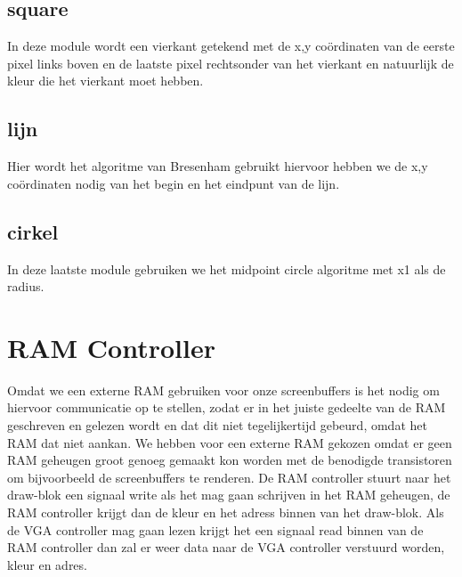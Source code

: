 \documentclass{scrreprt} %
\begin{document}
\subsection { square}
In deze module wordt een vierkant getekend met de x,y coördinaten van de eerste pixel links boven en de laatste pixel rechtsonder van het vierkant en natuurlijk de kleur die het vierkant moet hebben.

\subsection { lijn}
Hier wordt het algoritme van Bresenham gebruikt hiervoor hebben we de x,y coördinaten nodig van het begin en het eindpunt van de lijn.

\subsection { cirkel}
In deze laatste module gebruiken we het midpoint circle algoritme met x1 als de radius.

\section{RAM Controller}
Omdat we een externe RAM gebruiken voor onze screenbuffers is het nodig om hiervoor communicatie op te stellen, zodat er in het juiste gedeelte van de RAM geschreven en gelezen wordt en dat dit niet tegelijkertijd gebeurd, omdat het RAM dat niet aankan. We hebben voor een externe RAM gekozen omdat er geen RAM geheugen groot genoeg gemaakt kon worden met de benodigde transistoren om bijvoorbeeld de screenbuffers te renderen. De RAM controller stuurt naar het draw-blok een signaal write als het mag gaan schrijven in het RAM geheugen, de RAM controller krijgt dan de kleur en het adress binnen van het draw-blok. Als de VGA controller mag gaan lezen krijgt het een signaal read binnen van de RAM controller dan zal er weer data naar de VGA controller verstuurd worden, kleur en adres.
\end{document}
